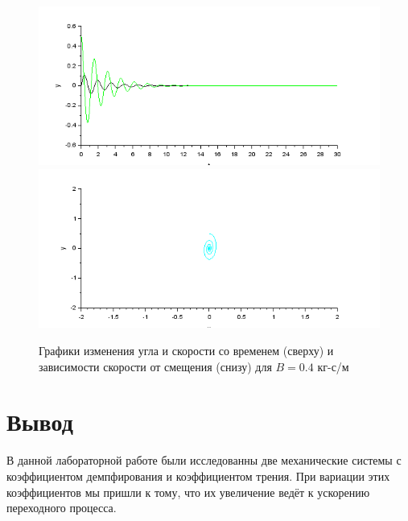 \documentclass[a4paper, 12pt]{article}
\begin{document}
\begin{figure}[h!]
	\centering
	\includegraphics[scale=0.8]{graph2-3}
	\includegraphics[scale=0.8]{graph2-4}
	\caption{Графики изменения угла и скорости со временем (сверху) и зависимости скорости от смещения (снизу) для $B = 0.4$ кг-с/м  }
	\label{p:Графики2-2}
\end{figure}

\clearpage

\section{Вывод}

В данной лабораторной работе были исследованны две механические системы с коэффициентом демпфирования и коэффициентом трения. При вариации этих коэффициентов мы пришли к тому, что их увеличение ведёт к ускорению переходного процесса. 
\end{document}
